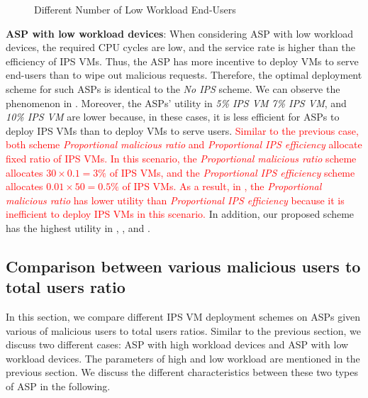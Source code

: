 \documentclass[10pt,journal, compsoc]{IEEEtran}
\begin{document}
\begin{figure}[!]
\captionsetup{justification=centering}
  \hfill
  \hfill
\label{fig:num_cmp_low}
\caption{Different Number of Low Workload End-Users}
\end{figure}

\textbf{ASP with low workload devices}:
When considering ASP with low workload devices, the required CPU cycles are low, and the service rate is higher than the efficiency of IPS VMs. Thus, the ASP has more incentive to deploy VMs to serve end-users than to wipe out malicious requests. Therefore, the optimal deployment scheme for such ASPs is identical to the \textit{No IPS} scheme. We can observe the phenomenon in . Moreover, the ASPs' utility in \textit{5\% IPS VM} \textit{7\% IPS VM}, and \textit{10\% IPS VM} are lower because, in these cases, it is less efficient for ASPs to deploy IPS VMs than to deploy VMs to serve users. \textcolor{red}{Similar to the previous case, both scheme \textit{Proportional malicious ratio} and \textit{Proportional IPS efficiency} allocate fixed ratio of IPS VMs. In this scenario, the \textit{Proportional malicious ratio} scheme allocates $30 \times 0.1 = 3\%$ of IPS VMs, and the \textit{Proportional IPS efficiency} scheme allocates $0.01 \times 50 = 0.5\%$ of IPS VMs. As a result, in , the \textit{Proportional malicious ratio} has lower utility than \textit{Proportional IPS efficiency} because it is inefficient to deploy IPS VMs in this scenario.} In addition, our proposed scheme has the highest utility in , , and .

\subsection{Comparison between various malicious users to total users ratio}\label{subsec:mal}
In this section, we compare different IPS VM deployment schemes on ASPs given various of malicious users to total users ratios. Similar to the previous section, we discuss two different cases: ASP with high workload devices and ASP with low workload devices. The parameters of high and low workload are mentioned in the previous section. We discuss the different characteristics between these two types of ASP in the following. 
\end{document}

